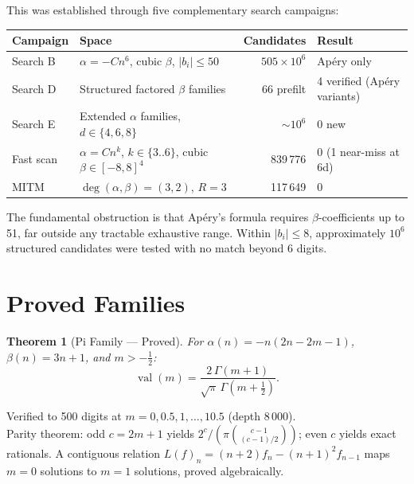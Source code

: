 \documentclass[11pt,a4paper]{article}
\newtheorem{theorem}{Theorem}
\begin{document}
\noindent
This was established through five complementary search campaigns:
\begin{center}
\renewcommand{\arraystretch}{1.1}
\begin{tabular}{@{}llrl@{}}
\toprule
\textbf{Campaign} & \textbf{Space} & \textbf{Candidates} & \textbf{Result} \\
\midrule
Search B & $\alpha=-C n^6$, cubic $\beta$, $|b_i|\le 50$ &
  $505\times10^6$ & Ap\'ery only \\
Search D & Structured factored $\beta$ families &
  66 prefilt & 4 verified (Ap\'ery variants) \\
Search E & Extended $\alpha$ families, $d\in\{4,6,8\}$ &
  $\sim10^6$ & 0 new \\
Fast scan & $\alpha=Cn^k$, $k\in\{3..6\}$, cubic $\beta\in[-8,8]^4$ &
  839\,776 & 0 (1 near-miss at 6d) \\
MITM & $\deg(\alpha,\beta)=(3,2)$, $R=3$ &
  117\,649 & 0 \\
\bottomrule
\end{tabular}
\end{center}

\noindent
The fundamental obstruction is that Ap\'ery's formula requires
$\beta$-coefficients up to 51, far outside any tractable exhaustive
range.  Within $|b_i| \le 8$, approximately $10^6$ structured candidates
were tested with no match beyond 6 digits.

\section{Proved Families}

\begin{theorem}[Pi Family --- Proved]
For $\alpha(n) = -n(2n - 2m - 1)$, $\beta(n) = 3n + 1$, and
$m > -\tfrac{1}{2}$:
\[
\operatorname{val}(m) = \frac{2\,\Gamma(m+1)}{\sqrt{\pi}\,\Gamma\!\left(m + \tfrac{1}{2}\right)}.
\]
\end{theorem}

\noindent
Verified to 500 digits at $m = 0, 0.5, 1, \ldots, 10.5$ (depth 8\,000). \\
Parity theorem: odd $c = 2m+1$ yields $2^c / (\pi \binom{c-1}{(c-1)/2})$;
even $c$ yields exact rationals.
A contiguous relation $L(f)_n = (n+2)f_n - (n+1)^2 f_{n-1}$ maps
$m=0$ solutions to $m=1$ solutions, proved algebraically.
\end{document}
